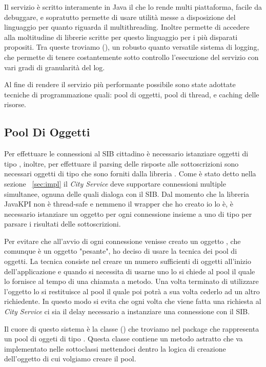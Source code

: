 Il servizio è scritto interamente in Java il che lo rende multi piattaforma, facile da debuggare, e sopratutto permette di usare utilità messe a disposizione del linguaggio per quanto riguarda il multithreading. Inoltre permette di accedere alla moltitudine di librerie scritte per questo linguaggio per i più disparati propositi. Tra queste troviamo (), un robusto quanto versatile sistema di logging, che permette di tenere costantemente sotto controllo l'esecuzione del servizio con vari gradi di granularità del log.

Al fine di rendere il servizio più performante possibile sono state adottate tecniche di programmazione quali: pool di oggetti, pool di thread, e caching delle risorse.


\subsection{Pool Di Oggetti}

Per effettuare le connessioni al SIB cittadino è necessario istanziare oggetti di tipo , inoltre, per effettuare il parsing delle risposte alle sottoscrizioni sono necessari oggetti di tipo  che sono forniti dalla libreria . Come è stato detto nella sezione ~\ref{sec:impl} il \emph{City Service} deve supportare connessioni multiple simultanee, ognuna delle quali dialoga con il SIB. Dal momento che la libreria {JavaKPI} non è thread-safe e nemmeno il wrapper che ho creato io lo è, è necessario istanziare un oggetto  per ogni connessione insieme a uno di tipo  per parsare i risultati delle sottoscrizioni.

Per evitare che all'avvio di ogni connessione venisse creato un oggetto , che comunque è un oggetto "pesante", ho deciso di usare la tecnica dei pool di oggetti. La tecnica consiste nel creare un numero sufficienti di oggetti all'inizio dell'applicazione e quando si necessita di usarne uno lo si chiede al pool il quale lo fornisce al tempo di una chiamata a metodo. Una volta terminato di utilizzare l'oggetto lo si restituisce al pool il quale poi potrà a sua volta cederlo ad un altro richiedente.
In questo modo si evita che ogni volta che viene fatta una richiesta al \emph{City Service} ci sia il delay necessario a instanziare una connessione con il SIB.

Il cuore di questo sistema è la classe  (\cite{objectpool}) che troviamo nel package  che rappresenta un pool di oggeti di tipo . Questa classe contiene un metodo astratto  che va implementato nelle sottoclassi mettendoci dentro la logica di creazione dell'oggetto di cui volgiamo creare il pool.

